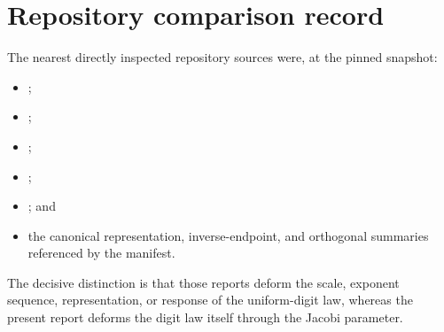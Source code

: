 \documentclass[11pt]{article}
\theoremstyle{definition}
\theoremstyle{remark}
\begin{document}
\section{Repository comparison record}

The nearest directly inspected repository sources were, at the pinned
snapshot:
\begin{itemize}
 \item {};
 \item {}
       ;
 \item {}
       ;
 \item {};
 \item {}; and
 \item the canonical representation, inverse-endpoint, and orthogonal
       summaries referenced by the manifest.
\end{itemize}
The decisive distinction is that those reports deform the scale, exponent
sequence, representation, or response of the uniform-digit law, whereas the
present report deforms the digit law itself through the Jacobi parameter.
\end{document}
